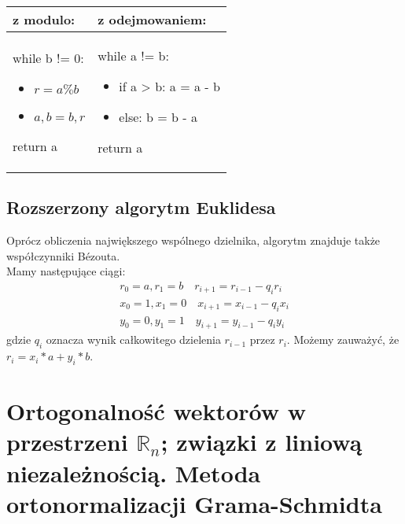 \documentclass[main.tex]{subfiles}
\begin{document}
    \begin{table}[H]
        \begin{center}
            \begin{tabular}{| p{} | p{} |}
                \hline
                z modulo: & z odejmowaniem:\\
                \hline
                while b != 0:
                \begin{itemize}
                    \item $r = a \% b$
                    \item $a, b = b, r$
                \end{itemize}
                return a

                &
                while a != b:
                \begin{itemize}
                    \item if a > b: a = a - b
                    \item else: b = b - a
                \end{itemize}
                return a\\
                \hline
            \end{tabular}
        \end{center}

    \end{table}


    \subsection{Rozszerzony algorytm Euklidesa}
    Oprócz obliczenia największego wspólnego dzielnika, algorytm znajduje także współczynniki Bézouta. \\
    Mamy następujące ciągi:
    \begin{gather*}
        r_0 = a, r_1 = b \quad r_{i + 1} = r_{i - 1} - q_{i}r_{i}\\
        x_0 = 1, x_1 = 0 \quad x_{i + 1} = x_{i - 1} - q_{i}x_{i}\\
        y_0 = 0, y_1 = 1 \quad y_{i + 1} = y_{i - 1} - q_{i}y_{i}
    \end{gather*}
    gdzie $q_{i}$ oznacza wynik całkowitego dzielenia $r_{i - 1}$ przez $r_i$. Możemy zauważyć, że $r_i = x_i * a + y_i * b$.

    \newpage


    \section{Ortogonalność wektorów w przestrzeni $\mathbb{R}_n$; związki z liniową niezależnością. Metoda ortonormalizacji Grama-Schmidta}
\end{document}
